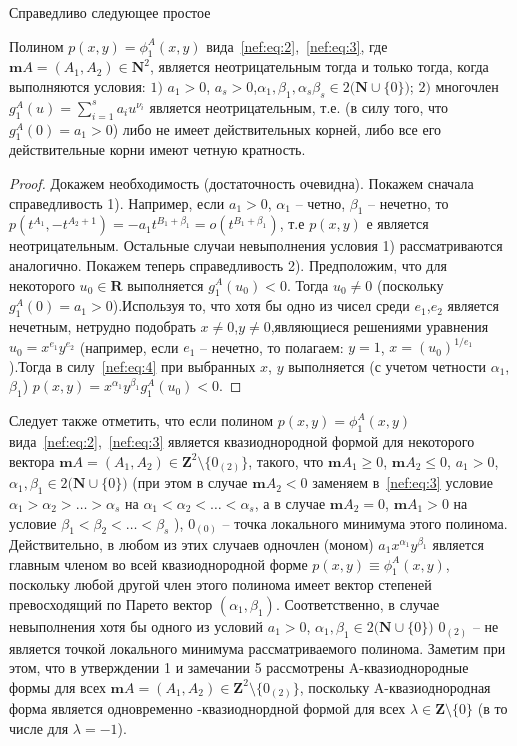 Справедливо следующее простое
\begin{statement} \label{nef:stat:1} Полином $p(x,y)=\phi^A_1(x,y)$ вида~\eqref{nef:eq:2},~\eqref{nef:eq:3}, где $\mathbf{m}A=(A_1,A_2)\in\mathbf{N}^2$, является неотрицательным тогда и только тогда, когда выполняются условия:\linebreak
	\indent $1)$ $a_1>0$, $a_s>0$,$\alpha_1,\beta_1,\alpha_s\beta_s\in 2\big(\mathbf{N}\cup\{0\}\big)$;\newline
	\indent$2)$ многочлен $g^A_1(u)=\sum_{i=1}^{s} a_iu^{\nu_i}$ является неотрицательным, т.е. (в силу того, что $g^A_1(0)=a_1>0$) либо не имеет действительных корней, либо все его действительные корни имеют четную кратность.
\end{statement}
\noindent \begin{proof} 
	Докажем необходимость (достаточность очевидна). Покажем сначала справедливость 1). Например, если $a_1>0$, $\alpha_1$ – четно, $\beta_1$ – нечетно, то $p(t^{A_1},-t^{A_2+1})=-a_1t^{B_1+\beta_1}=o(t^{B_1+\beta_1})$, т.е $p(x,y)$ е является неотрицательным. Остальные случаи невыполнения условия 1) рассматриваются аналогично. Покажем теперь справедливость 2). Предположим, что для некоторого $u_0\in\mathbf{R}$ выполняется $g^A_1(u_0)<0$. Тогда $u_0\not=0$ (поскольку $g^A_1(0)=a_1>0$).Используя то, что хотя бы одно из чисел среди $e_1$,$e_2$ является нечетным, нетрудно подобрать $x\not=0$,$y\not=0$,являющиеся решениями уравнения $u_0=x^{e_1}y^{e_2}$ (например, если $e_1$ – нечетно, то полагаем: $y=1$, $x=(u_0)^{1/e_1}$).Тогда в силу~\eqref{nef:eq:4} при выбранных $x$, $y$  выполняется (с учетом четности $\alpha_1$,$\beta_1$) $p(x,y)=x^{\alpha_1}y^{\beta_1}g^A_1(u_0)<0$. 
\end{proof}
\begin{remark}
	Следует также отметить, что если полином $p(x,y)=\phi^A_1(x,y)$ вида~\eqref{nef:eq:2},~\eqref{nef:eq:3} является квазиоднородной формой для некоторого вектора $\mathbf{m}A=(A_1,A_2)\in\mathbf{Z}^2\setminus\{0_{(2)}\}$, такого, что $\mathbf{m}A_1\geq0$, $\mathbf{m}A_2\leq0$, $a_1>0$, $\alpha_1,\beta_1\in2\big(\mathbf{N}\cup\{0\}\big)$ (при этом в случае $\mathbf{m}A_2<0$ заменяем в~\eqref{nef:eq:3} условие $\alpha_1>\alpha_2>\ldots>\alpha_s$ на $\alpha_1<\alpha_2<\ldots<\alpha_s$, а в случае $\mathbf{m}A_2=0$, $\mathbf{m}A_1>0$  на условие $\beta_1<\beta_2<\ldots<\beta_s$ ), $0_{(0)}$  – точка локального минимума этого полинома. Действительно, в любом из этих случаев одночлен (моном) $a_1x^{\alpha_{1}}y^{\beta_1}$ является главным членом во всей квазиоднородной форме $p(x,y)\equiv\phi^A_1(x,y)$,  поскольку любой другой член этого полинома имеет вектор степеней превосходящий по Парето вектор $(\alpha_1,\beta_1)$.  Соответственно, в случае невыполнения хотя бы одного из условий $a_1>0$, $\alpha_1,\beta_1\in2\big(\mathbf{N}\cup\{0\}\big)$ $0_{(2)}$ – не является точкой локального минимума рассматриваемого полинома. Заметим при этом, что в утверждении 1 и замечании 5 рассмотрены A-квазиоднородные формы для всех $\mathbf{m}A=(A_1,A_2)\in\mathbf{Z}^2\setminus\{0_{(2)}\}$,  поскольку A-квазиоднородная форма является одновременно -квазиоднордной формой для всех $\lambda \in\mathbf{Z}\setminus\{0\}$  (в то числе для $\lambda=-1$).
\end{remark}	

